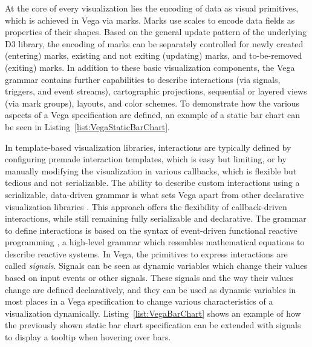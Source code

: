 At the core of every visualization lies the encoding of data as visual
primitives, which is achieved in Vega via marks. Marks use scales to
encode data fields as properties of their shapes. Based on the general
update pattern of the underlying D3 library, the encoding of marks can
be separately controlled for newly created (entering) marks, existing
and not exiting (updating) marks, and to-be-removed (exiting)
marks. In addition to these basic visualization components, the Vega
grammar contains further capabilities to describe interactions (via
signals, triggers, and event streams), cartographic projections,
sequential or layered views (via mark groups), layouts, and color
schemes. To demonstrate how the various aspects of a Vega
specification are defined, an example of a static bar chart can be
seen in Listing~\ref{list:VegaStaticBarChart}.


\begin{samepage}
%
The Vega specification of a static bar chart.
It demonstrates the use of data, scales, axes, and marks
to construct the bar chart.
},
]{listings/vega-static-bar-chart.json}
\end{samepage}


In template-based visualization libraries, interactions are typically
defined by configuring premade interaction templates, which is easy
but limiting, or by manually modifying the visualization in various
callbacks, which is flexible but tedious and not serializable. The
ability to describe custom interactions using a serializable,
data-driven grammar is what sets Vega apart from other declarative
visualization libraries \parencite{ReactiveVega}. This approach offers
the flexibility of callback-driven interactions, while still remaining
fully serializable and declarative. The grammar to define interactions
is based on the syntax of event-driven functional reactive programming
\parencite{EventDrivenFRP}, a high-level grammar which resembles
mathematical equations to describe reactive systems. In Vega, the
primitives to express interactions are called \emph{signals}. Signals
can be seen as dynamic variables which change their values based on
input events or other signals. These signals and the way their values
change are defined declaratively, and they can be used as dynamic
variables in most places in a Vega specification to change various
characteristics of a visualization dynamically.
Listing~\ref{list:VegaBarChart} shows an example of how the previously
shown static bar chart specification can be extended with signals to
display a tooltip when hovering over bars.



